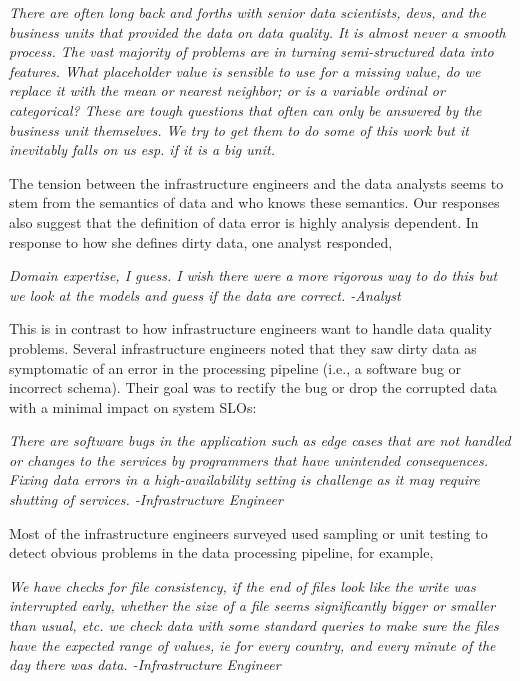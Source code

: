 \vspace{0.5em}
\emph{There are often long back and forths with senior data scientists, devs, and the business units that provided the data on data quality. It is almost never a smooth process. The vast majority of problems are in turning semi-structured data into features. What placeholder value is sensible to use for a missing value, do we replace it with the mean or nearest neighbor; or is a variable ordinal or categorical? These are tough questions that often can only be answered by the business unit themselves. We try to get them to do some of this work but it inevitably falls on us esp. if it is a big unit.}

\vspace{0.5em}

The tension between the infrastructure engineers and the data analysts seems to stem from the semantics of data and who knows these semantics. Our responses also suggest that the definition of data error is highly analysis dependent. In response to how she defines dirty data, one analyst responded,

\vspace{0.5em}
\emph{Domain expertise, I guess. I wish there were a more rigorous way to do this but we look at the models and guess if the data are correct. -Analyst}

\vspace{0.5em}

This is in contrast to how infrastructure engineers want to handle data quality problems. 
Several infrastructure engineers noted that they saw dirty data as symptomatic of an error in the processing pipeline (i.e., a software bug or incorrect schema). Their goal was to rectify the bug or drop the corrupted data with a minimal impact on system SLOs:

\vspace{0.5em}
\emph{There are software bugs in the application such as edge cases that are not handled or changes to the services by programmers that have unintended consequences. Fixing data errors in a high-availability setting is challenge as it may require shutting of services. -Infrastructure Engineer}

\vspace{0.5em}

Most of the infrastructure engineers surveyed used sampling or unit testing to detect obvious problems in the data processing pipeline, for example,

\vspace{0.5em}
\emph{We have checks for file consistency, if the end of files look like the write was interrupted early, whether the size of a file seems significantly bigger or smaller than usual, etc. we check data with some standard queries to make sure the files have the expected range of values, ie for every country, and every minute of the day there was data. -Infrastructure Engineer}

